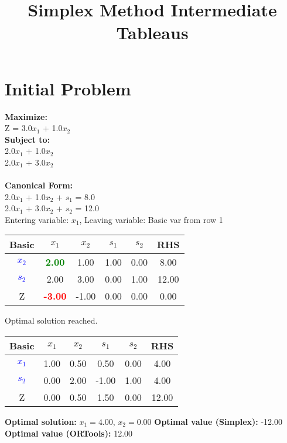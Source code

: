 \documentclass{article}
\begin{document}
\title{Simplex Method Intermediate Tableaus}
\maketitle
\section*{Initial Problem}
\textbf{Maximize:} \\Z = 3.0\(x_{1}\) + 1.0\(x_{2}\)
\\
\textbf{Subject to:} \\2.0\(x_{1}\) + 1.0\(x_{2}\) \\
2.0\(x_{1}\) + 3.0\(x_{2}\) \\
\\
\textbf{Canonical Form:} \\2.0\(x_{1}\) + 1.0\(x_{2}\) + \(s_{1}\) = 8.0\\
2.0\(x_{1}\) + 3.0\(x_{2}\) + \(s_{2}\) = 12.0\\

Entering variable: \(x_{1}\), Leaving variable: Basic var from row 1
\newline\begin{minipage}{\textwidth}
\begin{tabular}{|c|c|c|c|c|c|}
\hline
Basic & \(x_{1}\) & \(x_{2}\) & \(s_{1}\) & \(s_{2}\) & RHS \\
\hline
\textcolor{blue}{\(x_{2}\)} & \textbf{\textcolor{green}{2.00}} & 1.00 & 1.00 & 0.00 & 8.00  \\
\hline
\textcolor{blue}{\(s_{2}\)} & 2.00 & 3.00 & 0.00 & 1.00 & 12.00  \\
\hline
Z & \textbf{\textcolor{red}{-3.00}} & -1.00 & 0.00 & 0.00 & 0.00  \\
\hline
\end{tabular}
\end{minipage}
Optimal solution reached.
\newline\begin{minipage}{\textwidth}
\begin{tabular}{|c|c|c|c|c|c|}
\hline
Basic & \(x_{1}\) & \(x_{2}\) & \(s_{1}\) & \(s_{2}\) & RHS \\
\hline
\textcolor{blue}{\(x_{1}\)} & 1.00 & 0.50 & 0.50 & 0.00 & 4.00  \\
\hline
\textcolor{blue}{\(s_{2}\)} & 0.00 & 2.00 & -1.00 & 1.00 & 4.00  \\
\hline
Z & 0.00 & 0.50 & 1.50 & 0.00 & 12.00  \\
\hline
\end{tabular}
\end{minipage}
\textbf{Optimal solution:} \(x_{1} = 4.00\), \(x_{2} = 0.00\)
\textbf{Optimal value (Simplex):} -12.00
\textbf{Optimal value (ORTools):} 12.00
\end{document}
